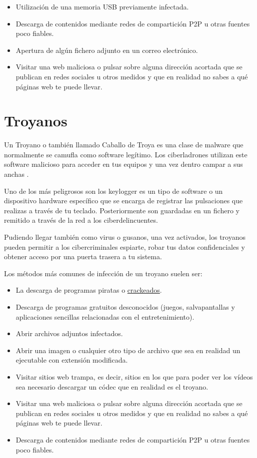 \documentclass[
  spanish,
  a4paper,
  openany]{book}
\begin{document}
\begin{itemize}
\item
  Utilización de una memoria USB previamente infectada.
\item
  Descarga de contenidos mediante redes de compartición P2P u otras fuentes poco fiables.
\item
  Apertura de algún fichero adjunto en un correo electrónico.
\item
  Visitar una web maliciosa o pulsar sobre alguna dirección acortada que se publican en redes sociales u otros medidos y que en realidad no sabes a qué páginas web te puede llevar.
\end{itemize}

\hypertarget{troyanos}{%
\section{Troyanos}\label{troyanos}}

Un Troyano o también llamado Caballo de Troya es una clase de malware que normalmente se camufla como software legítimo. Los ciberladrones utilizan este software malicioso para acceder en tus equipos y una vez dentro campar a sus anchas \citep{KASPER-troyano}.

Uno de los más peligrosos son los keylogger es un tipo de software o un dispositivo hardware específico que se encarga de registrar las pulsaciones que realizas a través de tu teclado. Posteriormente son guardadas en un fichero y remitido a través de la red a los ciberdelincuentes.

Pudiendo llegar también como virus o gusanos, una vez activados, los troyanos pueden permitir a los cibercriminales espiarte, robar tus datos confidenciales y obtener acceso por una puerta trasera a tu sistema.

Los métodos más comunes de infección de un troyano suelen ser:

\begin{itemize}
\item
  La descarga de programas piratas o \href{https://es.wikipedia.org/wiki/Cracking_(software)}{crackeados}.
\item
  Descarga de programas gratuitos desconocidos (juegos, salvapantallas y aplicaciones sencillas relacionadas con el entretenimiento).
\item
  Abrir archivos adjuntos infectados.
\item
  Abrir una imagen o cualquier otro tipo de archivo que sea en realidad un ejecutable con extensión modificada.
\item
  Visitar sitios web trampa, es decir, sitios en los que para poder ver los vídeos sea necesario descargar un códec que en realidad es el troyano.
\item
  Visitar una web maliciosa o pulsar sobre alguna dirección acortada que se publican en redes sociales u otros medidos y que en realidad no sabes a qué páginas web te puede llevar.
\item
  Descarga de contenidos mediante redes de compartición P2P u otras fuentes poco fiables.
\end{itemize}
\end{document}

